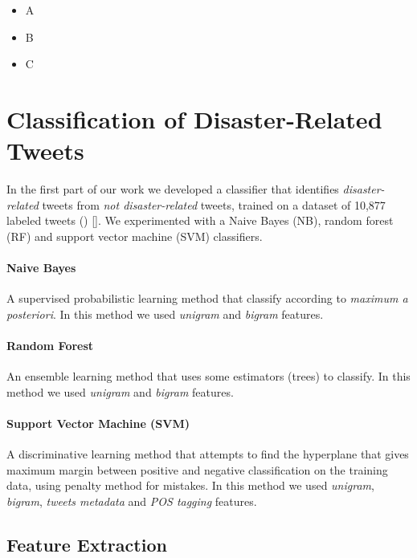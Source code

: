 \documentclass[letterpaper,twocolumn,10pt]{article}
\begin{document}
\begin{itemize}[noitemsep,nolistsep]
	\item A
	\item B
	\item C
\end{itemize}



\section{Classification of Disaster-Related Tweets}

In the first part of our work we developed a classifier that identifies \textit{disaster-related} tweets from \textit{not disaster-related} tweets, trained on a dataset of 10,877 labeled tweets () []. We experimented with a Naive Bayes (NB), random forest (RF) and support vector machine (SVM) classifiers.

\paragraph{Naive Bayes}
A supervised probabilistic learning method that classify according to \textit{maximum a posteriori}. In this method we used \textit{unigram} and \textit{bigram} features.

\paragraph{Random Forest}
An ensemble learning method that uses some estimators (trees) to classify. In this method we used \textit{unigram} and \textit{bigram} features.

\paragraph{Support Vector Machine (SVM)}
A discriminative learning method that attempts to find the hyperplane that gives maximum margin between positive and negative classification on the training data, using penalty method for mistakes. In this method we used \textit{unigram}, \textit{bigram}, \textit{tweets metadata} and \textit{POS tagging} features.

\subsection{Feature Extraction}
\end{document}
